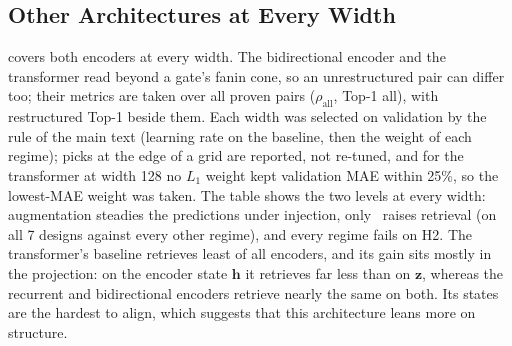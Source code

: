 \subsection{Other Architectures at Every Width}\label{app:arch}
\begin{table}[h]
\centering\scriptsize
\caption{Bidirectional encoder and transformer, every width (EPFL test, 5 seeds each). $\rho_{\text{all}}$ and Top-1 all:
over all proven pairs; Top-1 restr.: restructured pairs; \ours\ on $\mathbf h$: retrieval on the encoder state instead of the projection.}
\label{tab:app_arch}
\resizebox{\columnwidth}{!}{}
\end{table}
\noindent {} covers both encoders at every width. The bidirectional encoder and the transformer read beyond a gate's fanin cone, so an unrestructured pair can
differ too; their metrics are taken over all proven pairs ($\rho_{\text{all}}$, Top-1 all), with restructured Top-1 beside
them. Each width was selected on validation by the rule of the main text (learning rate on the baseline, then the weight
of each regime); picks at the edge of a grid are reported, not re-tuned, and for the transformer at width 128 no $L_1$
weight kept validation MAE within 25\%, so the lowest-MAE weight was taken. The table shows the two levels at
every width: augmentation steadies the predictions under injection, only \ours\ raises retrieval (on all 7 designs against
every other regime), and every regime fails on H2. The transformer's baseline retrieves least of all encoders, and its
gain sits mostly in the projection: on the encoder state $\mathbf h$ it retrieves far less than on $\mathbf z$, whereas the recurrent and
bidirectional encoders retrieve nearly the same on both. Its states are the hardest to align, which suggests that this architecture leans more on structure.



